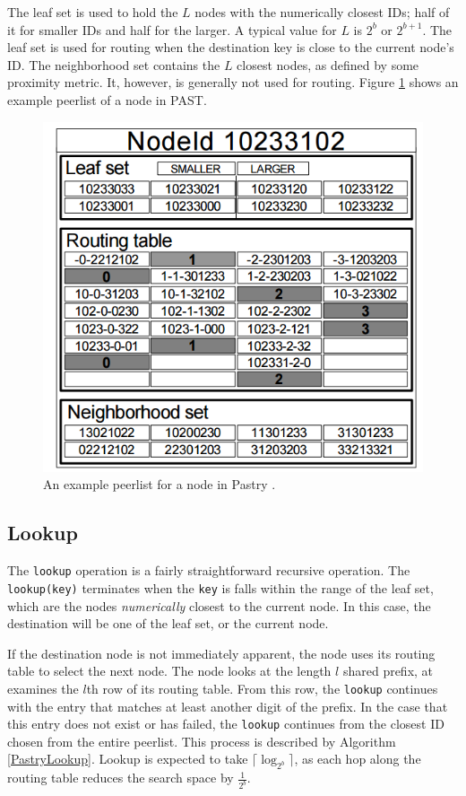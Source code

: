 The leaf set is used to hold the $L$ nodes with the numerically closest IDs;  half of it for smaller IDs and half for the larger.
A typical value for $L$ is $2^b$ or $2^{b+1}$.
The leaf set is used for routing when the destination key is close to the current node's ID.
The neighborhood set contains the $L$ closest nodes, as defined by some proximity metric.  
It, however, is generally not used for routing.  
Figure \ref{fig:pastry-table} shows an example peerlist of a node in PAST.

\begin{figure}
	\centering
	\includegraphics[width=0.5\linewidth]{figs/pastry-table}
	\caption{An example peerlist for a node in Pastry \cite{pastry}.}
	\label{fig:pastry-table}
\end{figure}



\subsection*{Lookup}
The \texttt{lookup} operation is a fairly straightforward recursive operation.
The \texttt{lookup(key)} terminates when the \texttt{key} is falls within the range of the leaf set, which are the nodes \emph{numerically} closest to the current node.
In this case, the destination will be one of the leaf set, or the current node.

If the destination node is not immediately apparent, the node uses its routing table to select the next node.
The node looks at the length $l$ shared prefix,  at examines the $l$th row of its routing table.
From this row, the \texttt{lookup} continues with the entry that matches at least another digit of the prefix.
In the case that this entry does not exist or has failed, the \texttt{lookup} continues from the closest ID chosen from the entire peerlist.
This process is described by Algorithm \ref{PastryLookup}.
Lookup is expected  to take $\lceil \log_{2^{b}} \rceil $, as each hop along the routing table reduces the search space by $\frac{1}{2^{b}}$.
 
